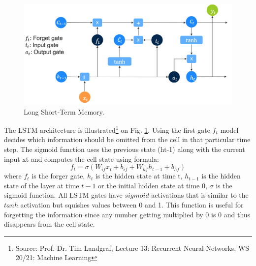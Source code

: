 \begin{figure}[htb]
	\begin{center}
		\includegraphics[width=1\textwidth, keepaspectratio]{gfx/lstm.png}
		\caption{\label{fig:lstm}Long Short-Term Memory.}
	\end{center}
\end{figure}
The LSTM architecture is illustrated\footnote{Source: Prof. Dr. Tim Landgraf, Lecture 13: Recurrent Neural Networks, WS 20/21: Machine Learning} on Fig. \ref{fig:lstm}. Using the first gate $f_t$ model decides which information should be omitted from the cell in that particular time step. The sigmoid function uses the previous state (ht-1) along with the current input xt and computes the cell state using formula:
\begin{equation}
f_t = \sigma (W_{if}x_t + b_{if} + W_{hf}h_{t-1} + b_{hf})
\end{equation}
where $f_t$ is the forger gate, $h_{t}$  is the hidden state at time t, $h_{t-1}$ is the hidden state of the layer at time $t-1$ or the initial hidden state at time $0$, $\sigma$ is the sigmoid function. All LSTM gates have $sigmoid$ activations that  is similar to the $tanh$ activation but squishes values between 0 and 1. This function is useful for forgetting the information since any number getting multiplied by 0 is 0 and thus disappears from the cell state. 

